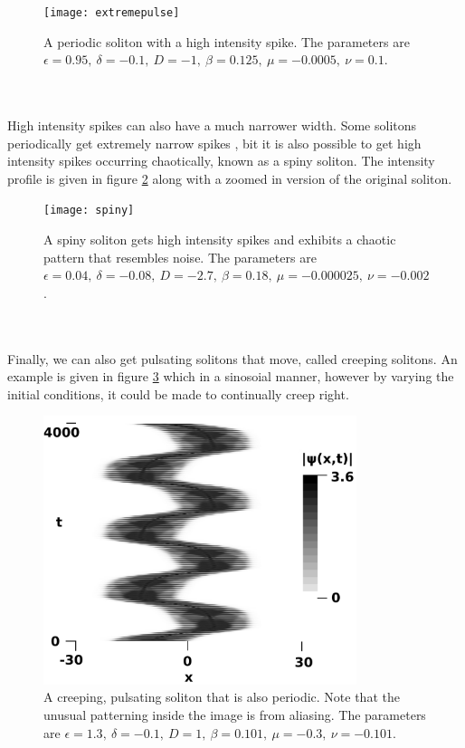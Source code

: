 \documentclass[a4paper,12pt]{report}
\begin{document}
\begin{figure}[h]
\hspace*{-1.4cm}
\texttt{[image: extremepulse]}
\caption{A periodic soliton with a high intensity spike. The parameters are $\epsilon=0.95,\ \delta=-0.1,\ D=-1, \ \beta=0.125, \ \mu=-0.0005,\ \nu=0.1$.\cite{extreme}}
\label{highamp} 
\end{figure}
\\\\
High intensity spikes can also have a much narrower width. Some solitons periodically get extremely narrow spikes \cite{spike}, bit it is also possible to get high intensity spikes occurring chaotically, known as a spiny soliton. The intensity profile is given in figure \ref{spiny} along with a zoomed in version of the original soliton.
\begin{figure}[h]
\hspace*{-1.4cm}
\texttt{[image: spiny]}
\caption{A spiny soliton gets high intensity spikes and exhibits a chaotic pattern that resembles noise. The parameters are $\epsilon=0.04,\ \delta=-0.08,\ D=-2.7, \ \beta=0.18, \ \mu=-0.000025,\ \nu=-0.002$.\cite{spiny}}
\label{spiny} 
\end{figure}
\\\\
Finally, we can also get pulsating solitons that move, called creeping solitons. An example is given in figure \ref{periodpulse} which in a sinosoial manner, however by varying the initial conditions, it could be made to continually creep right.
\begin{figure}[h]
\centering
\includegraphics[width=3.6in]{periodpulse}
\caption{A creeping, pulsating soliton that is also periodic. Note that the unusual patterning inside the image is from aliasing. The parameters are $\epsilon=1.3,\ \delta=-0.1,\ D=1, \ \beta=0.101, \ \mu=-0.3,\ \nu=-0.101$.\cite{2001}}
\label{periodpulse} 
\end{figure}
\end{document}
